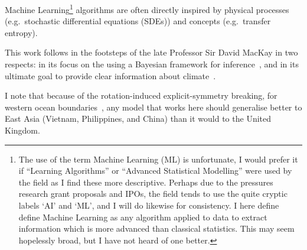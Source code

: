 Machine Learning\footnote{The use of the term Machine Learning (ML) is unfortunate,
I would prefer it if ``Learning Algorithms'' or ``Advanced Statistical Modelling''
 were used by the field as I find these more descriptive.
  Perhaps due to the pressures research grant proposals and IPOs,
   the field tends to use the quite cryptic labels `AI' and `ML',
   and I will do likewise for consistency.
   I here define define Machine Learning as any algorithm applied to data
    to extract information which is more advanced than classical statistics.
    This may seem hopelessly broad, but I have not heard of one better. }
algorithms are often directly inspired by physical processes (e.g.\
stochastic differential equations (SDEs)) and concepts (e.g.\ transfer entropy).


This work follows in the footsteps of the late Professor Sir David MacKay
in two respects: in its focus on the using a Bayesian framework for inference~\cite{ITILA, MacKay91},
and in its ultimate goal to provide clear information about climate~\cite{mackay2008sustainable}.

I note that because of the rotation-induced explicit-symmetry breaking, for western ocean boundaries~\cite{hogg1995western},
 any model that works here should generalise better to East Asia (Vietnam, Philippines,
  and China) than it would to the United Kingdom.
